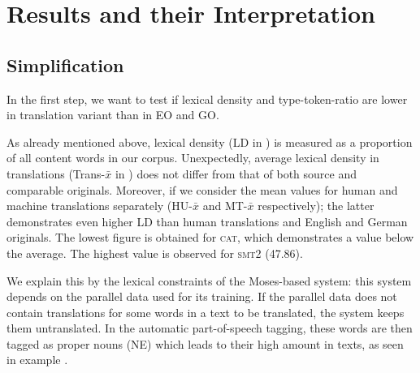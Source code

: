 \documentclass[output=paper]{LSP/langsci}
\begin{document}
\section{Results and their Interpretation} \label{sec:4:4} 
\subsection{Simplification}
In the first step, we want to test if lexical density and type-token-ratio are lower in translation variant than in EO and GO.


     \begin{table}
     \centering
 \caption{\textsc{st}TR and LD in \textsc{vartra}-\textsc{small}}
     \label{tab:4.2}
\end{table}


As already mentioned above, lexical density (LD in ) is measured as a proportion of all content words in our corpus. Unexpectedly, average lexical density in translations (Trans-$\bar{x}$ in ) does not differ from that of both source and comparable originals. Moreover, if we consider the mean values for human and machine translations separately (HU-$\bar{x}$ and MT-$\bar{x}$ respectively); the latter demonstrates even higher LD than human translations and English and German originals. The lowest figure is obtained for \textsc{cat}, which demonstrates a value below the average. The highest value is observed for \textsc{smt}2 (47.86).

We explain this by the lexical constraints of the Moses-based system: this system depends on the parallel data used for its training.  If the parallel data does not contain translations for some words in a text to be translated, the system keeps them untranslated. In the automatic part-of-speech tagging, these words are then tagged as proper nouns (NE) which leads to their high amount in texts, as seen in example .
\end{document}
